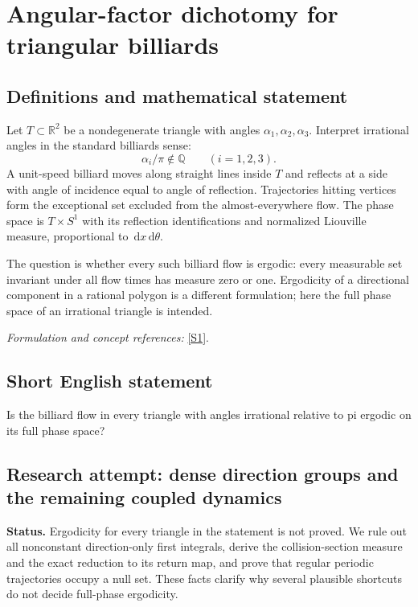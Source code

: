 \documentclass[11pt]{article}
\begin{document}
\section*{\texorpdfstring{Angular-factor dichotomy for triangular billiards}{Angular-factor dichotomy for triangular billiards}}\label{20003342}
\subsection{Definitions and mathematical statement}
Let $T\subset{\mathbb{R}}^2$ be a nondegenerate triangle with angles $\alpha_1,\alpha_2,\alpha_3$. Interpret irrational angles in the standard billiards sense:
\[
 \alpha_i/\pi\notin{\mathbb{Q}}\qquad(i=1,2,3).
\]
A unit-speed billiard moves along straight lines inside $T$ and reflects at a side with angle of incidence equal to angle of reflection. Trajectories hitting vertices form the exceptional set excluded from the almost-everywhere flow. The phase space is $T\times S^1$ with its reflection identifications and normalized Liouville measure, proportional to ${\,\mathrm{d}} x{\,\mathrm{d}}\theta$.

The question is whether every such billiard flow is ergodic: every measurable set invariant under all flow times has measure zero or one. Ergodicity of a directional component in a rational polygon is a different formulation; here the full phase space of an irrational triangle is intended.
\par\smallskip\textit{Formulation and concept references:} \href{https://aimath.org/WWN/measrigid/measrigid.pdf}{[S1]}.

\subsection{Short English statement}
Is the billiard flow in every triangle with angles irrational relative to pi ergodic on its full phase space?
\subsection{Research attempt: dense direction groups and the remaining coupled dynamics}
\textbf{Status.} Ergodicity for every triangle in the statement is not proved. We rule out all nonconstant direction-only first integrals, derive the collision-section measure and the exact reduction to its return map, and prove that regular periodic trajectories occupy a null set. These facts clarify why several plausible shortcuts do not decide full-phase ergodicity.
\end{document}
